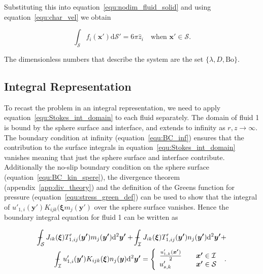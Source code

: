 \documentclass[12pt]{article}
\def\Xint#1{\mathchoice
{\XXint\displaystyle\textstyle{#1}}%
{\XXint\textstyle\scriptstyle{#1}}%
{\XXint\scriptstyle\scriptscriptstyle{#1}}%
{\XXint\scriptscriptstyle\scriptscriptstyle{#1}}%
\!\int}
\def\XXint#1#2#3{{\setbox0=\hbox{$#1{#2#3}{\int}$}
\vcenter{\hbox{$#2#3$}}\kern-.5\wd0}}
\def\dashint{\Xint-}
\begin{document}
Substituting this into equation~\ref{equ:nodim_fluid_solid} and using equation~\ref{equ:char_vel} we obtain

\begin{equation}
\label{equ:BC_dyn_sphere}
\int_{\mathcal{S}} f_{i}(\boldsymbol{x'}) \mathrm{d} \mathcal{S}' = 6 \pi \hat{z}_{i} \quad \text{when } \boldsymbol{x'} \in \mathcal{S}.
\end{equation}

The dimensionless numbers that describe the system are the set $\{\lambda, D, \text{Bo}\}$.

\subsection{Integral Representation}
\label{subsec:prob_int_rep}

To recast the problem in an integral representation, we need to apply equation~\ref{equ:Stokes_int_domain} to each fluid separately. The domain of fluid 1 is bound by the sphere surface and interface, and extends to infinity as $r, z \to \infty$. The boundary condition at infinity (equation~\ref{equ:BC_inf}) ensures that the contribution to the surface integrals in equation~\ref{equ:Stokes_int_domain} vanishes meaning that just the sphere surface and interface contribute. Additionally the no-slip boundary condition on the sphere surface (equation~\ref{equ:BC_kin_spere}), the divergence theorem (appendix~\ref{app:div_theory}) and the definition of the Greens function for pressure (equation~\ref{equ:stress_green_def}) can be used to show that the integral of $u'_{1,i}(\boldsymbol{y'}) K_{ijk}(\boldsymbol{\xi} m_{j}(\boldsymbol{y'})$ over the sphere surface vanishes. Hence the boundary integral equation for fluid 1 can be written as 


\begin{align}
\label{equ:bie_fluid1}
\dashint_{\mathcal{S}} J_{ik}(\boldsymbol{\xi}) T'_{1,ij}(\boldsymbol{y'}) m_{j}(\boldsymbol{y'}) \mathrm{d}^{2} \boldsymbol{y'} + \dashint_{\mathcal{I}} J_{ik}(\boldsymbol{\xi}) T'_{1,ij}(\boldsymbol{y'}) n_{j}(\boldsymbol{y'}) \mathrm{d}^{2}\boldsymbol{y'} + \nonumber \\
\dashint_{\mathcal{I}} u'_{1,i}(\boldsymbol{y'}) K_{ijk}(\boldsymbol{\xi}) n_{j}(\boldsymbol{y}) \mathrm{d}^{2}\boldsymbol{y'} = 
\left\{
    \begin{array}{l l}
      \frac{u'_{1,k}(\boldsymbol{x'})}{2} &\quad \boldsymbol{x'} \in \mathcal{I} \\
      u'_{s,k} &\quad \boldsymbol{x'} \in \mathcal{S} 
\end{array}
\right.\ .
\end{align}
\end{document}
